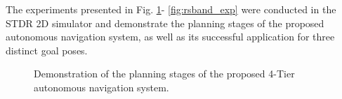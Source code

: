 \documentclass[conference]{IEEEtran}
\begin{document}
The experiments presented in Fig. \ref{fig:rsband_path}- \ref{fig:rsband_exp} were conducted in the STDR 2D simulator and demonstrate the planning stages of the proposed autonomous navigation system, as well as its successful application for three distinct goal poses.

\begin{figure}[!ht]
	\centering
	\hspace{0.05cm}
	\hspace{0.05cm}
	\caption{Demonstration of the planning stages of the proposed 4-Tier autonomous navigation system.}
  \label{fig:rsband_path}
\end{figure}
\end{document}
